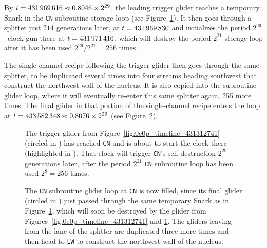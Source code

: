 By $t = 431{\,}969{\,}616 \approx 0.8046 \times 2^{29}$, the leading trigger glider reaches a temporary Snark in the \texttt{CN} subroutine storage loop (see Figure~\ref{fig:0e0p_timeline_431969616}). It then goes through a splitter just $214$ generations later, at $t = 431{\,}969{\,}830$ and initializes the period $2^{29}$~clock gun there at $t = 431{\,}971{\,}416$, which will destroy the period $2^{21}$ storage loop after it has been used $2^{29}/2^{21} = 256$ times.

The single-channel recipe following the trigger glider then goes through the same splitter, to be duplicated several times into four streams heading southwest that construct the northwest wall of the nucleus. It is also copied into the subroutine glider loop, where it will eventually re-enter this same splitter again, 255 more times. The final glider in that portion of the single-channel recipe enters the loop at $t = 433{\,}582{\,}348 \approx 0.8076 \times 2^{29}$ (see Figure~\ref{fig:0e0p_timeline_433582348}).

\begin{figure}[!htb]
	\centering
	\caption{The trigger glider from Figure~\ref{fig:0e0p_timeline_431312741} (circled in ) has reached \texttt{CN} and is about to start the clock there (highlighted in ). That clock will trigger \texttt{CN}'s self-destruction $2^{29}$ generations later, after the period $2^{21}$ \texttt{CN} subroutine loop has been used $2^8 = 256$ times.}
	\label{fig:0e0p_timeline_431969616}
\end{figure}

\begin{figure}[!htb]
	\centering
	\caption{The \texttt{CN} subroutine glider loop at \texttt{CN} is now filled, since its final glider (circled in ) just passed through the same temporary Snark as in Figure~\ref{fig:0e0p_timeline_431969616}, which will soon be destroyed by the glider from Figures~\ref{fig:0e0p_timeline_431312741} and \ref{fig:0e0p_timeline_431969616}. The gliders leaving from the  lane of the splitter are duplicated three more times and then head to \texttt{LW} to construct the northwest wall of the nucleus.}
	\label{fig:0e0p_timeline_433582348}
\end{figure}

